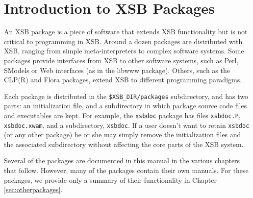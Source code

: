\chapter{Introduction to XSB Packages} \label{packages}

An XSB package is a piece of software that extends XSB functionality
but is not critical to programming in XSB.  Around a dozen packages
are distributed with XSB, ranging from simple meta-interpreters to
complex software systems.  Some packages provide interfaces from XSB
to other software systems, such as Perl, SModels or Web interfaces (as
in the libwww package).  Others, such as the CLP(R) and Flora
packages, extend XSB to different programming paradigms.

Each package is distributed in the {\tt \$XSB\_DIR/packages}
subdirectory, and has two parts: an initialization file, and a
subdirectory in which package source code files and executables are
kept.  For example, the {\tt xsbdoc} package has files {\tt xsbdoc.P},
{\tt xsbdoc.xwam}, and a subdirectory, {\tt xsbdoc}.  If a user
doesn't want to retain {\tt xsbdoc} (or any other package) he or she
may simply remove the initialization files and the associated
subdirectory without affecting the core parts of the XSB system.

Several of the packages are documented in this manual in the various
chapters that follow.  However, many of the packages contain their own
manuals.  For these packages, we provide only a summary of their
functionality in Chapter \ref{sec:otherpackages}.

